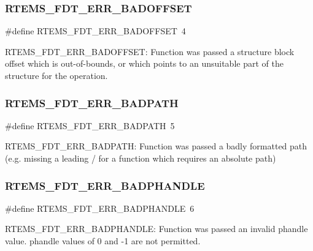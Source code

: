 \subsubsection{\texorpdfstring{RTEMS\_FDT\_ERR\_BADOFFSET}{RTEMS\_FDT\_ERR\_BADOFFSET}}
{\footnotesize\ttfamily \#define R\+T\+E\+M\+S\+\_\+\+F\+D\+T\+\_\+\+E\+R\+R\+\_\+\+B\+A\+D\+O\+F\+F\+S\+ET~4}

R\+T\+E\+M\+S\+\_\+\+F\+D\+T\+\_\+\+E\+R\+R\+\_\+\+B\+A\+D\+O\+F\+F\+S\+ET\+: Function was passed a structure block offset which is out-\/of-\/bounds, or which points to an unsuitable part of the structure for the operation. \mbox{\label{rtems-fdt_8h_a6408443266323215cd2616432644ab6f}} 
\subsubsection{\texorpdfstring{RTEMS\_FDT\_ERR\_BADPATH}{RTEMS\_FDT\_ERR\_BADPATH}}
{\footnotesize\ttfamily \#define R\+T\+E\+M\+S\+\_\+\+F\+D\+T\+\_\+\+E\+R\+R\+\_\+\+B\+A\+D\+P\+A\+TH~5}

R\+T\+E\+M\+S\+\_\+\+F\+D\+T\+\_\+\+E\+R\+R\+\_\+\+B\+A\+D\+P\+A\+TH\+: Function was passed a badly formatted path (e.\+g. missing a leading / for a function which requires an absolute path) \mbox{\label{rtems-fdt_8h_a65317278a6c62afefc1d986c8c1686ad}} 
\subsubsection{\texorpdfstring{RTEMS\_FDT\_ERR\_BADPHANDLE}{RTEMS\_FDT\_ERR\_BADPHANDLE}}
{\footnotesize\ttfamily \#define R\+T\+E\+M\+S\+\_\+\+F\+D\+T\+\_\+\+E\+R\+R\+\_\+\+B\+A\+D\+P\+H\+A\+N\+D\+LE~6}

R\+T\+E\+M\+S\+\_\+\+F\+D\+T\+\_\+\+E\+R\+R\+\_\+\+B\+A\+D\+P\+H\+A\+N\+D\+LE\+: Function was passed an invalid phandle value. phandle values of 0 and -\/1 are not permitted. \mbox{\label{rtems-fdt_8h_a750ba759dda889c4a66d6eaa232c878a}} 
